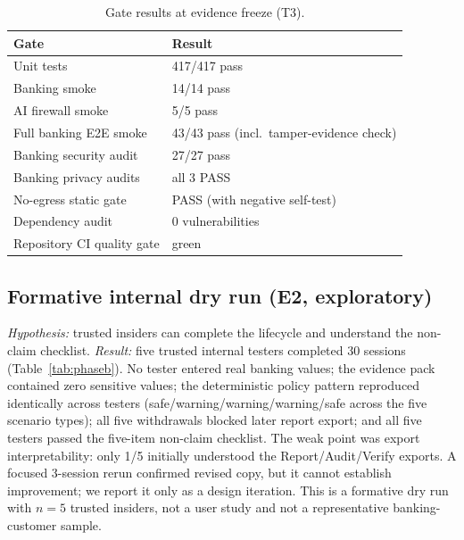 \documentclass[conference]{IEEEtran}
\begin{document}
\begin{table}[t]
\caption{Gate results at evidence freeze (T3).}
\centering
\footnotesize
\begin{tabular}{ll}
\toprule
Gate & Result \\
\midrule
Unit tests & 417/417 pass \\
Banking smoke & 14/14 pass \\
AI firewall smoke & 5/5 pass \\
Full banking E2E smoke & 43/43 pass (incl.\ tamper-evidence check) \\
Banking security audit & 27/27 pass \\
Banking privacy audits & all 3 PASS \\
No-egress static gate & PASS (with negative self-test) \\
Dependency audit & 0 vulnerabilities \\
Repository CI quality gate & green \\
\bottomrule
\end{tabular}
\label{tab:gates}
\end{table}

\subsection{Formative internal dry run (E2, exploratory)}
\label{sec:dryrun}

\emph{Hypothesis:} trusted insiders can complete the lifecycle and understand
the non-claim checklist. \emph{Result:} five trusted internal testers completed
30 sessions (Table~\ref{tab:phaseb}). No tester entered real banking values; the
evidence pack contained zero sensitive values; the deterministic policy pattern
reproduced identically across testers (safe/warning/warning/warning/safe across
the five scenario types); all five withdrawals blocked later report export; and
all five testers passed the five-item non-claim checklist. The weak point was
export interpretability: only 1/5 initially understood the Report/Audit/Verify
exports. A focused 3-session rerun confirmed revised copy, but it cannot
establish improvement; we report it only as a design iteration. This is a
formative dry run with $n=5$ trusted insiders, not a user study and not a
representative banking-customer sample.
\end{document}
